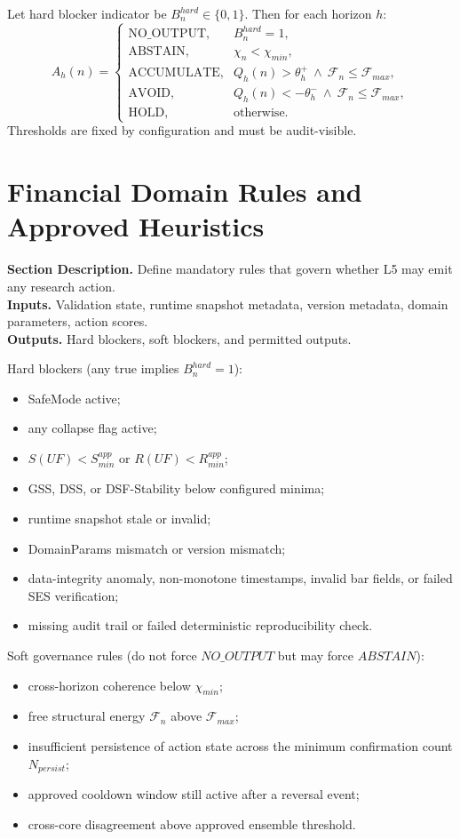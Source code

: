 \documentclass[11pt]{report}
\newcommand{\meta}[3]{\textbf{Section Description.} #1\\
\textbf{Inputs.} #2\\
\textbf{Outputs.} #3\par}
\begin{document}
Let hard blocker indicator be $B_n^{hard}\in\{0,1\}$. Then for each horizon $h$:
\[
A_h(n)=\begin{cases}
\text{NO\_OUTPUT}, & B_n^{hard}=1,\\
\text{ABSTAIN}, & \chi_n<\chi_{min},\\
\text{ACCUMULATE}, & Q_h(n)>\theta_h^{+}\ \wedge\ \mathcal{F}_n\le\mathcal{F}_{max},\\
\text{AVOID}, & Q_h(n)<-\theta_h^{-}\ \wedge\ \mathcal{F}_n\le\mathcal{F}_{max},\\
\text{HOLD}, & \text{otherwise.}
\end{cases}
\]
Thresholds are fixed by configuration and must be audit-visible.

\section{Financial Domain Rules and Approved Heuristics}
\meta{Define mandatory rules that govern whether L5 may emit any research action.}{Validation state, runtime snapshot metadata, version metadata, domain parameters, action scores.}{Hard blockers, soft blockers, and permitted outputs.}

Hard blockers (any true implies $B_n^{hard}=1$):
\begin{itemize}
    \item SafeMode active;
    \item any collapse flag active;
    \item $S(UF)<S_{min}^{app}$ or $R(UF)<R_{min}^{app}$;
    \item GSS, DSS, or DSF-Stability below configured minima;
    \item runtime snapshot stale or invalid;
    \item DomainParams mismatch or version mismatch;
    \item data-integrity anomaly, non-monotone timestamps, invalid bar fields, or failed SES verification;
    \item missing audit trail or failed deterministic reproducibility check.
\end{itemize}

Soft governance rules (do not force $NO\_OUTPUT$ but may force $ABSTAIN$):
\begin{itemize}
    \item cross-horizon coherence below $\chi_{min}$;
    \item free structural energy $\mathcal{F}_n$ above $\mathcal{F}_{max}$;
    \item insufficient persistence of action state across the minimum confirmation count $N_{persist}$;
    \item approved cooldown window still active after a reversal event;
    \item cross-core disagreement above approved ensemble threshold.
\end{itemize}
\end{document}
